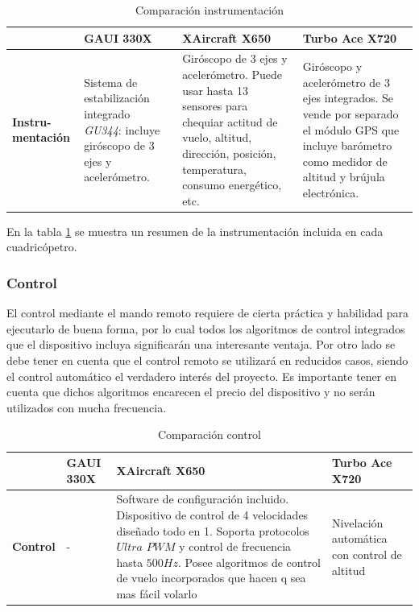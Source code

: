 \documentclass[main]{subfiles}
\begin{document}
\begin{table}[H]
\begin{tabular}{p{40pt}|p{85pt}|p{125pt}|p{130pt}|} 
\cline{2-4}
& \cellcolor[gray]{0.8} \textbf{GAUI 330X} 
& \cellcolor[gray]{0.8} \textbf{XAircraft X650} 
& \cellcolor[gray]{0.8} \textbf{Turbo Ace X720} \\ \cline{2-4} \hline
\multicolumn{1}{|p{40pt}|}{\cellcolor[gray]{0.8}\textbf{Instru- mentaci\'on}} 
& Sistema de estabilizaci\'on integrado \emph{GU344}: incluye gir\'oscopo de 3 ejes y aceler\'ometro. & Gir\'oscopo de 3 ejes y aceler\'ometro. Puede usar hasta 13 sensores para chequiar actitud de vuelo, altitud, direcci\'on, posici\'on, temperatura, consumo energ\'etico, etc. & Gir\'oscopo y aceler\'ometro de 3 ejes integrados. Se vende por separado el m\'odulo GPS que incluye bar\'ometro como medidor de altitud y br\'ujula electr\'onica.\\ 
\hline 
\end{tabular}
\caption{Comparaci\'on instrumentaci\'on}
\label{tab:instrumentacion}
\end{table}

	En la tabla \ref{tab:instrumentacion} se muestra un resumen de la instrumentaci\'on incluida en cada cuadric\'opetro. 

\subsubsection*{Control}

	El control mediante el mando remoto requiere de cierta pr\'actica y habilidad para ejecutarlo de buena forma, por lo cual todos los algoritmos de control integrados que el dispositivo incluya significar\'an una interesante ventaja. Por otro lado se debe tener en cuenta que el control remoto se utilizar\'a en reducidos casos, siendo el control autom\'atico el verdadero inter\'es del proyecto. Es importante tener en cuenta que dichos algoritmos encarecen el precio del dispositivo y no ser\'an utilizados con mucha frecuencia.

\begin{table}[H]
\begin{tabular}{p{40pt}|p{70pt}|p{160pt}|p{110pt}|} 
\cline{2-4}
& \cellcolor[gray]{0.8} \textbf{GAUI 330X} 
& \cellcolor[gray]{0.8} \textbf{XAircraft X650} 
& \cellcolor[gray]{0.8} \textbf{Turbo Ace X720} \\ \cline{2-4} \hline
\multicolumn{1}{|p{40pt}|}{\cellcolor[gray]{0.8}\textbf{Control}} 
& - & Software de configuraci\'on incluido. Dispositivo de control de 4 velocidades dise\~nado todo en 1. Soporta protocolos $Ultra$ $PWM$ y control de frecuencia hasta $500Hz$. Posee algoritmos de control de vuelo incorporados que hacen q sea mas f\'acil volarlo & Nivelaci\'on autom\'atica con control de altitud \\ 
\hline 
\end{tabular}
\caption{Comparaci\'on control}
\label{tab:control}
\end{table}
\end{document}
